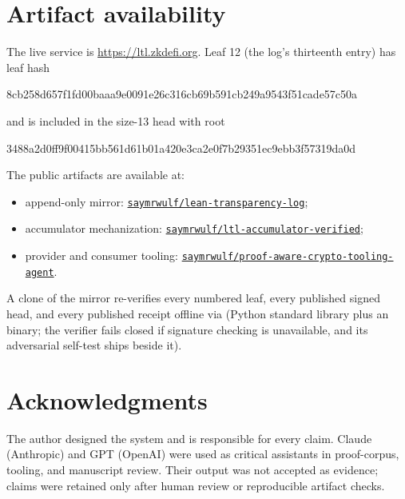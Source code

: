 \documentclass[11pt]{article}
\theoremstyle{remark}
\newcommand{\code}[1]{\texttt{\detokenize{#1}}}
\begin{document}
\section*{Artifact availability}
The live service is \url{https://ltl.zkdefi.org}. Leaf 12 (the log's thirteenth entry) has leaf hash
\begin{center}\small\ttfamily
8cb258d657f1fd00baaa9e0091e26c316cb69b591cb249a9543f51cade57c50a
\end{center}
and is included in the size-13 head with root
\begin{center}\small\ttfamily
3488a2d0ff9f00415bb561d61b01a420e3ca2e0f7b29351ec9ebb3f57319da0d
\end{center}
The public artifacts are available at:
\begin{itemize}[leftmargin=1.5em,itemsep=1pt]
\item append-only mirror: \href{https://github.com/saymrwulf/lean-transparency-log}{\texttt{saymrwulf/lean-transparency-log}};
\item accumulator mechanization: \href{https://github.com/saymrwulf/ltl-accumulator-verified}{\texttt{saymrwulf/ltl-accumulator-verified}};
\item provider and consumer tooling: \href{https://github.com/saymrwulf/proof-aware-crypto-tooling-agent}{\texttt{saymrwulf/proof-aware-crypto-tooling-agent}}.
\end{itemize}
A clone of the mirror re-verifies every numbered leaf, every published signed
head, and every published receipt offline via \code{python3 verify.py --all}
(Python standard library plus an \code{openssl} binary; the verifier fails
closed if signature checking is unavailable, and its adversarial self-test
ships beside it).

\section*{Acknowledgments}
The author designed the system and is responsible for every claim. Claude
(Anthropic) and GPT (OpenAI) were used as critical assistants in proof-corpus,
tooling, and manuscript review. Their output was not accepted as evidence;
claims were retained only after human review or reproducible artifact checks.
\end{document}
